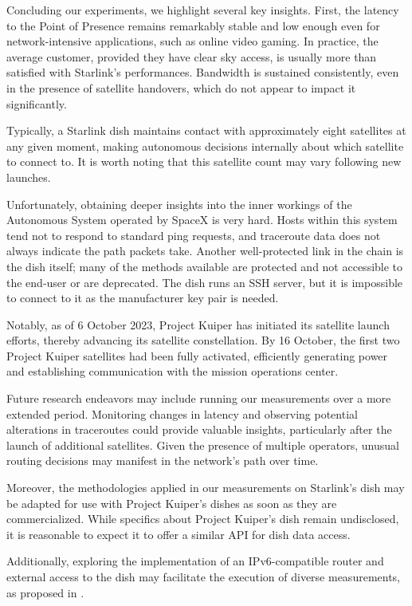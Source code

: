 \documentclass[IN,11pt,twoside,openright,idp,english]{tumthesis}
\begin{document}
Concluding our experiments, we highlight several key insights. First, the latency to the Point of Presence remains remarkably stable and low enough even for network-intensive applications, such as online video gaming. In practice, the average customer, provided they have clear sky access, is usually more than satisfied with Starlink's performances. Bandwidth is sustained consistently, even in the presence of satellite handovers, which do not appear to impact it significantly.

Typically, a Starlink dish maintains contact with approximately eight satellites at any given moment, making autonomous decisions internally about which satellite to connect to. It is worth noting that this satellite count may vary following new launches.

Unfortunately, obtaining deeper insights into the inner workings of the Autonomous System operated by SpaceX is very hard. Hosts within this system tend not to respond to standard ping requests, and traceroute data does not always indicate the path packets take. Another well-protected link in the chain is the dish itself; many of the methods available are protected and not accessible to the end-user or are deprecated. The dish runs an SSH server, but it is impossible to connect to it as the manufacturer key pair is needed.

Notably, as of 6 October 2023, Project Kuiper has initiated its satellite launch efforts, thereby advancing its satellite constellation. By 16 October, the first two Project Kuiper satellites had been fully activated, efficiently generating power and establishing communication with the mission operations center.

Future research endeavors may include running our measurements over a more extended period. Monitoring changes in latency and observing potential alterations in traceroutes could provide valuable insights, particularly after the launch of additional satellites. Given the presence of multiple operators, unusual routing decisions may manifest in the network's path over time.

Moreover, the methodologies applied in our measurements on Starlink's dish may be adapted for use with Project Kuiper's dishes as soon as they are commercialized. While specifics about Project Kuiper's dish remain undisclosed, it is reasonable to expect it to offer a similar API for dish data access.

Additionally, exploring the implementation of an IPv6-compatible router and external access to the dish may facilitate the execution of diverse measurements, as proposed in \cite{izhikevich2023democratizing}.
\end{document}
